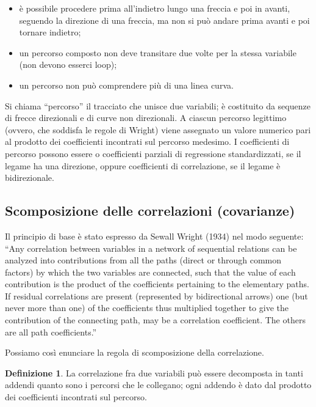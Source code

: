 \documentclass[
  11pt,
]{krantz}
\providecommand{\tightlist}{%
  \setlength{\itemsep}{0pt}\setlength{\parskip}{0pt}}
\theoremstyle{definition}
\newtheorem{definition}{Definizione}[chapter]
\theoremstyle{definition}
\theoremstyle{definition}
\theoremstyle{definition}
\theoremstyle{remark}
\begin{document}
\begin{itemize}
\tightlist
\item
  è possibile procedere prima all'indietro lungo una freccia e poi in avanti, seguendo la direzione di una freccia, ma non si può andare prima avanti e poi tornare indietro;
\item
  un percorso composto non deve transitare due volte per la stessa variabile (non devono esserci loop);
\item
  un percorso non può comprendere più di una linea curva.
\end{itemize}

Si chiama ``percorso'' il tracciato che unisce due variabili; è costituito da sequenze di frecce direzionali e di curve non direzionali. A ciascun percorso legittimo (ovvero, che soddisfa le regole di Wright) viene assegnato un valore numerico pari al prodotto dei coefficienti incontrati sul percorso medesimo. I coefficienti di percorso possono essere o coefficienti parziali di regressione standardizzati, se il legame ha una direzione, oppure coefficienti di correlazione, se il legame è bidirezionale.

\hypertarget{scomposizione-delle-correlazioni-covarianze}{%
\subsection{Scomposizione delle correlazioni (covarianze)}\label{scomposizione-delle-correlazioni-covarianze}}

Il principio di base è stato espresso da Sewall Wright (1934) nel modo seguente: ``Any correlation between variables in a network of sequential relations can be analyzed into contributions from all the paths (direct or through common factors) by which the two variables are connected, such that the value of each contribution is the product of the coefficients pertaining to the elementary paths. If residual correlations are present (represented by bidirectional arrows) one (but never more than one) of the coefficients thus multiplied together to give the contribution of the connecting path, may be a correlation coefficient. The others are all path coefficients.''

Possiamo così enunciare la regola di scomposizione della correlazione.

\begin{definition}
La correlazione fra due variabili può essere decomposta in tanti addendi quanto sono i percorsi che le collegano; ogni addendo è dato dal prodotto dei coefficienti incontrati sul percorso.
\end{definition}
\end{document}
